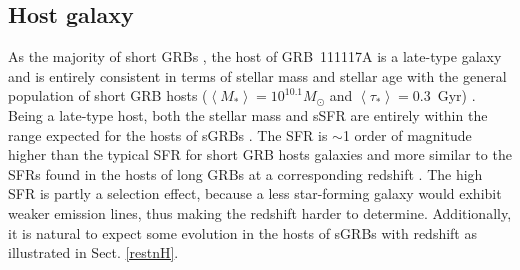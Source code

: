 \documentclass{aa}    %
\begin{document}

\subsection{Host galaxy}

As the majority of short GRBs \citep{Fong2013b}, the host of GRB~111117A is a
late-type galaxy and is entirely consistent in terms of stellar mass and stellar
age with the general population of short GRB hosts ($\left\langle M _*
\right\rangle = 10^{10.1} M_{\odot}$ and $\left\langle \tau _* \right\rangle =
0.3 $~Gyr) \citep{Leibler2010}. Being a late-type host, both the stellar mass
and sSFR are entirely within the range expected for the hosts of sGRBs
\citep{Behroozi2014}. The SFR is $\sim$1 order of magnitude higher than the
typical SFR for short GRB hosts galaxies \citep{Berger2014} and more similar to
the SFRs found in the hosts of long GRBs at a corresponding redshift
\citep{Kruhler2015}. The high SFR is partly a selection effect, because a less
star-forming galaxy would exhibit weaker emission lines, thus making the
redshift harder to determine. Additionally, it is natural to expect some
evolution in the hosts of sGRBs with redshift as illustrated in Sect.
\ref{restnH}.




\end{document}
